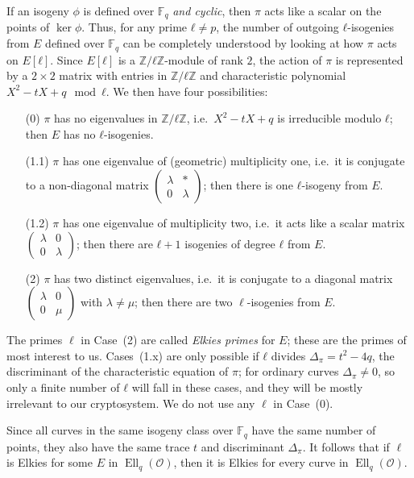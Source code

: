 \documentclass{llncs}
\newcommand{\F}{\mathbb{F}}
\renewcommand{\O}{\mathcal{O}}
\DeclareMathOperator{\Ell}{Ell}
\begin{document}
If an isogeny $ϕ$ is defined over $\F_q$ \emph{and cyclic},
then $π$ acts like a scalar on the points of $\ker ϕ$. 
Thus, for any prime $ℓ≠p$, the number of outgoing $ℓ$-isogenies from $E$ 
defined over $\F_q$ can be
completely understood by looking at how $π$ acts on $E[ℓ]$. Since $E[ℓ]$
is a $ℤ/ℓℤ$-module of rank $2$, the action of $π$ is represented by a
$2×2$ matrix with entries in $ℤ/ℓℤ$ and characteristic polynomial
$X^2-tX+q\mod ℓ$. We then have four possibilities:
\begin{itemize}
\item[(0)] $π$ has no eigenvalues in $ℤ/ℓℤ$, i.e.\ $X^2-tX+q$ is
  irreducible modulo $ℓ$; then $E$ has no $ℓ$-isogenies.
\item[(1.1)] $π$ has one eigenvalue of (geometric) multiplicity one,
  i.e.\ it is conjugate to a non-diagonal matrix
  $\left(\begin{smallmatrix}λ&*\\0&λ\end{smallmatrix}\right)$; then
  there is one $ℓ$-isogeny from $E$.
\item[(1.2)] $π$ has one eigenvalue of multiplicity two, i.e.\ it acts
  like a scalar matrix
  $\left(\begin{smallmatrix}λ&0\\0&λ\end{smallmatrix}\right)$; then
  there are $ℓ+1$ isogenies of degree $ℓ$ from $E$.
\item[(2)] $π$ has two distinct eigenvalues, i.e.\ it is conjugate to a
  diagonal matrix
  $\left(\begin{smallmatrix}λ&0\\0&μ\end{smallmatrix}\right)$
	with $\lambda\neq\mu$; then
  there are two $\ell$-isogenies from $E$.
\end{itemize}

The primes $\ell$ in Case~(2)
are called \emph{Elkies primes} for $E$;
these are the primes of most interest to us.
Cases~(1.x) are only possible if $ℓ$ divides $Δ_π = t^2-4q$,
the discriminant of the characteristic equation of $π$;
for ordinary curves $Δ_π≠0$, so only a finite number
of $ℓ$ will fall in these cases, and they will be mostly
irrelevant to our cryptosystem.
We do not use any $\ell$ in Case~(0).

Since all curves in
the same isogeny class over $\F_q$ have the same number of points,
they also have the same trace $t$ and discriminant $Δ_π$.
It follows that if $\ell$ is Elkies for some $E$ in $\Ell_q(\O)$,
then it is Elkies for every curve in $\Ell_q(\O)$.
\end{document}
